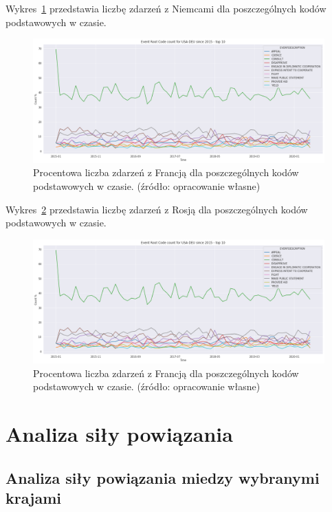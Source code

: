 \documentclass[11pt]{report}
\begin{document}
    Wykres~\ref{fig:USADEUERC} przedstawia liczbę zdarzeń z Niemcami dla poszczególnych kodów podstawowych w czasie.
    \begin{figure}[!htp]
        \centering
        \includegraphics[width=\linewidth]{fig/USA/USADEUERCperc.png}
        \caption{Procentowa liczba zdarzeń z Francją dla poszczególnych kodów podstawowych w czasie. (źródło: opracowanie własne)}
        \label{fig:USADEUERC}
    \end{figure}

    Wykres~\ref{fig:USARUSERC} przedstawia liczbę zdarzeń z Rosją dla poszczególnych kodów podstawowych w czasie.
    \begin{figure}[!htp]
        \centering
        \includegraphics[width=\linewidth]{fig/USA/USADEUERCperc.png}
        \caption{Procentowa liczba zdarzeń z Francją dla poszczególnych kodów podstawowych w czasie. (źródło: opracowanie własne)}
        \label{fig:USARUSERC}
    \end{figure}


    \section{Analiza siły powiązania}

    \subsection{Analiza siły powiązania miedzy wybranymi krajami}
\end{document}
